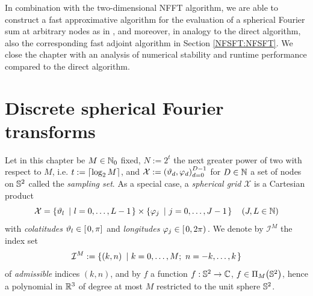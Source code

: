 In combination with the two-dimensional NFFT algorithm, we are able 
to construct a fast approximative algorithm for the evaluation
of a spherical Fourier sum at arbitrary nodes as in \cite{kupo02},
and moreover, in analogy to the direct algorithm, also the corresponding
fast adjoint algorithm in Section \ref{NFSFT:NFSFT}.
We close the chapter with an analysis of numerical stability and runtime 
performance compared to the direct algorithm.

\section{Discrete spherical Fourier transforms}
\label{NFSFT:dsfts}

Let in this chapter be $M \in \mathbb{N}_{0}$ fixed, $N := 2^t$ the 
next greater power of two with respect to $M$, i.e. $t := 
{\left\lceil\log_2 M\right\rceil}$, and $\mathcal{X} := 
\left(\vartheta_d,\varphi_d\right)_{d=0}^{D-1}$ for $D \in \mathbb{N}$
a set of nodes on $\mathbb{S}^2$ called the \emph{sampling set}. 
As a special case, a \emph{spherical grid} 
$\mathcal{X}$ is a Cartesian product 
\[
  \mathcal{X} = \left\{\vartheta_{l}\ \left|\ l=0,\ldots,L-1\right.\right\rbrace \times \left\{\varphi_{j}\ \left|\ j=0,\ldots,J-1\right.\right\rbrace \quad \left(J,L \in \mathbb{N}\right)
\]
with \emph{colatitudes} $\vartheta_{l} \in \left[\left.0,\pi\right]\right.$ and \emph{longitudes} $\varphi_{j} \in \left[\left.0,2\pi\right)\right.$.
We denote by $\mathcal{I}^M$ the index set
\[
  \mathcal{I}^M := \left\{\left(k,n\right)\ \left|\ k=0,\ldots,M;\ n=-k,\ldots,k\right.\right\rbrace
\]
of \emph{admissible} indices $(k,n)$, and by $f$ a function $f: \mathbb{S}^2 \rightarrow \mathbb{C}$, $f \in \Pi_{M}{\hspace{-0.4ex}}\left(\mathbb{S}^2\right)$, hence a polynomial in $\mathbb{R}^3$ of degree at most $M$ restricted to the unit sphere $\mathbb{S}^2$.

